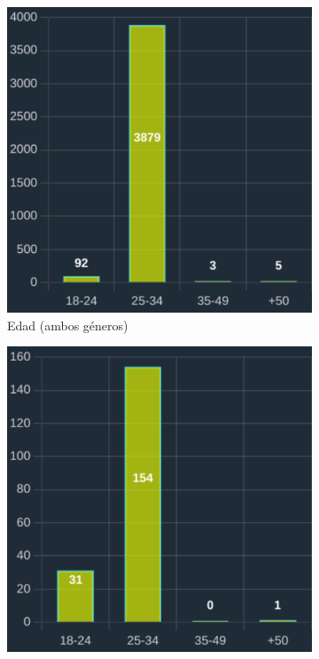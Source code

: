 \begin{figure}[H]
  \centering
  \begin{subfigure}{0.3\textwidth}
   \includegraphics[width=\textwidth]{imaxes/capturas-app/graficos/grivas/grafico-edad-grivas.png}
  \caption{Edad (ambos géneros)} 
  \end{subfigure}
  \begin{subfigure}{0.3\textwidth}
   \includegraphics[width=\textwidth]{imaxes/capturas-app/graficos/grivas/grafico-edad-grivas-femenino.png}

\end{subfigure}
\end{figure}

